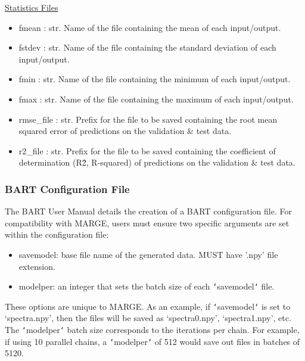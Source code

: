 \documentclass[letterpaper, 12pt]{article}
\begin{document}
\noindent \underline{Statistics Files}
\begin{itemize}
\item fmean      : str.  Name of the file containing the mean of each input/output.
\item fstdev     : str.  Name of the file containing the standard deviation of each 
                   input/output.
\item fmin       : str.  Name of the file containing the minimum of each input/output.
\item fmax       : str.  Name of the file containing the maximum of each input/output.
\item rmse\_file  : str.  Prefix for the file to be saved containing the root mean 
                   squared error of predictions on the validation \& test data.
\item r2\_file    : str.  Prefix for the file to be saved containing the coefficient of
                   determination (R\^2, R-squared) of predictions on the 
                   validation \& test data.
\end{itemize}



\subsubsection{BART Configuration File}
\label{sec:BARTconfig}

The BART User Manual details the creation of a BART configuration file.  For 
compatibility with MARGE, users must ensure two specific arguments are set 
within the configuration file:
\begin{itemize}
\item savemodel: base file name of the generated data. MUST have '.npy' file 
                 extension.
\item modelper: an integer that sets the batch size of each 
                \texttt{`}savemodel\texttt{`} file.
\end{itemize}

\noindent These options are unique to MARGE.  As an example, if 
\texttt{`}savemodel\texttt{`} is set to `spectra.npy', then the files will be 
saved as `spectra0.npy', `spectra1.npy', etc.  The \texttt{`}modelper\texttt{`} 
batch size corresponds to the iterations per chain.  For example, if using 10 
parallel chains, a \texttt{`}modelper\texttt{`} of 512 would save out files in 
batches of 5120.\newline
\end{document}

